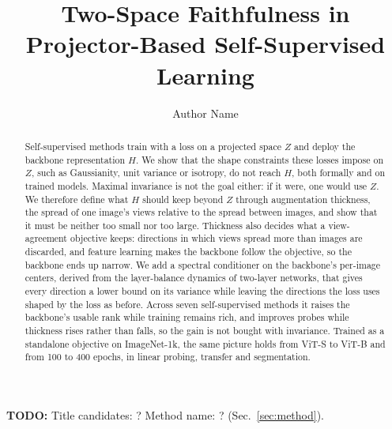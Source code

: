 \documentclass[11pt]{article}
\title{Two-Space Faithfulness in Projector-Based Self-Supervised Learning}
\author{Author Name}
\date{}
\numberwithin{equation}{section}
\theoremstyle{definition}
\theoremstyle{remark}
\newcommand{\TODO}[1]{\textcolor{red!70!black}{\textbf{TODO:} #1}}
\begin{document}
\maketitle

\TODO{Title candidates: ? Method name: ? (Sec.~\ref{sec:method}).}

\begin{abstract}
Self-supervised methods train with a loss on a projected space \(Z\) and deploy the backbone representation \(H\). We show that the shape constraints these losses impose on \(Z\), such as Gaussianity, unit variance or isotropy, do not reach \(H\), both formally and on trained models. Maximal invariance is not the goal either: if it were, one would use \(Z\). We therefore define what \(H\) should keep beyond \(Z\) through augmentation thickness, the spread of one image's views relative to the spread between images, and show that it must be neither too small nor too large. Thickness also decides what a view-agreement objective keeps: directions in which views spread more than images are discarded, and feature learning makes the backbone follow the objective, so the backbone ends up narrow. We add a spectral conditioner on the backbone's per-image centers, derived from the layer-balance dynamics of two-layer networks, that gives every direction a lower bound on its variance while leaving the directions the loss uses shaped by the loss as before. Across seven self-supervised methods it raises the backbone's usable rank while training remains rich, and improves probes while thickness rises rather than falls, so the gain is not bought with invariance. Trained as a standalone objective on ImageNet-1k, the same picture holds from ViT-S to ViT-B and from 100 to 400 epochs, in linear probing, transfer and segmentation.
\end{abstract}
\end{document}
